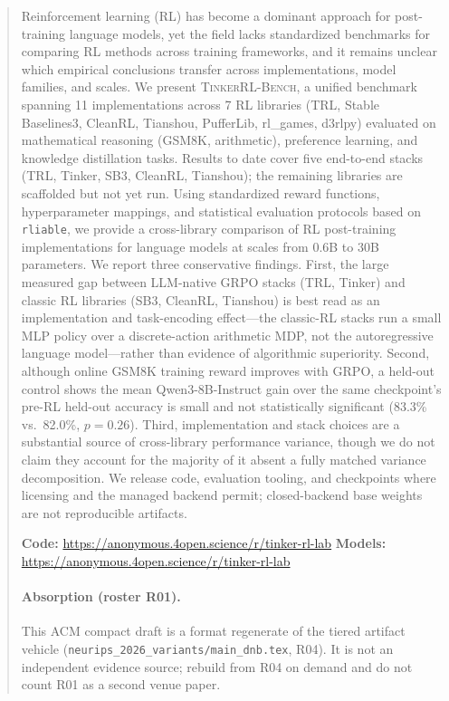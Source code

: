 \documentclass[manuscript,review,anonymous]{acmart}
\newcommand{\ours}{\textsc{TinkerRL-Bench}}
\begin{document}
\begin{abstract}
Reinforcement learning (RL) has become a dominant approach for post-training
language models, yet the field lacks standardized benchmarks for comparing RL
methods across training frameworks, and it remains unclear which empirical
conclusions transfer across implementations, model families, and scales. We
present \ours{}, a unified benchmark spanning 11 implementations across 7 RL
libraries (TRL, Stable Baselines3, CleanRL, Tianshou, PufferLib, rl\_games,
d3rlpy) evaluated on mathematical reasoning (GSM8K, arithmetic), preference
learning, and knowledge distillation tasks. Results to date cover five
end-to-end stacks (TRL, Tinker, SB3, CleanRL, Tianshou); the remaining
libraries are scaffolded but not yet run. Using standardized reward functions,
hyperparameter mappings, and statistical evaluation protocols based on
\texttt{rliable}, we provide a cross-library comparison of RL post-training
implementations for language models at scales from 0.6B to 30B parameters.
We report three conservative findings. First, the large measured gap between
LLM-native GRPO stacks (TRL, Tinker) and classic RL libraries (SB3, CleanRL,
Tianshou) is best read as an implementation and task-encoding effect---the
classic-RL stacks run a small MLP policy over a discrete-action arithmetic MDP,
not the autoregressive language model---rather than evidence of algorithmic
superiority. Second, although online GSM8K training reward improves with GRPO,
a held-out control shows the mean Qwen3-8B-Instruct gain over the same
checkpoint's pre-RL held-out accuracy is small and not statistically
significant (83.3\% vs.\ 82.0\%, $p{=}0.26$). Third, implementation and
stack choices are a substantial source of cross-library performance variance,
though we do not claim they account for the majority of it absent a fully
matched variance decomposition. We release code, evaluation tooling, and
checkpoints where licensing and the managed backend permit; closed-backend base
weights are not reproducible artifacts.

\textbf{Code:} \url{https://anonymous.4open.science/r/tinker-rl-lab} \quad
\textbf{Models:} \url{https://anonymous.4open.science/r/tinker-rl-lab}

\paragraph{Absorption (roster R01).}
This ACM compact draft is a format regenerate of the tiered artifact vehicle
(\texttt{neurips\_2026\_variants/main\_dnb.tex}, R04). It is not an independent
evidence source; rebuild from R04 on demand and do not count R01 as a second
venue paper.
\end{abstract}
\end{document}
